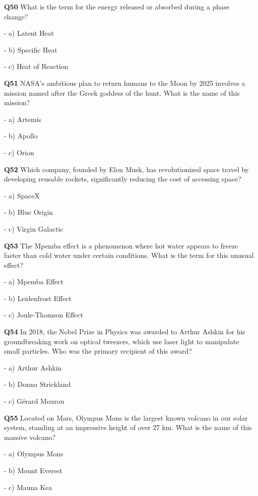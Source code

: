 \textbf{Q50} What is the term for the energy released or absorbed during a phase change?\par
\quad - a) Latent Heat\par
\quad - b) Specific Heat\par
\quad - c) Heat of Reaction\par

\textbf{Q51} NASA's ambitious plan to return humans to the Moon by 2025 involves a mission named after the Greek goddess of the hunt. What is the name of this mission?\par
\quad - a) Artemis\par
\quad - b) Apollo\par
\quad - c) Orion\par

\textbf{Q52} Which company, founded by Elon Musk, has revolutionized space travel by developing reusable rockets, significantly reducing the cost of accessing space?\par
\quad - a) SpaceX\par
\quad - b) Blue Origin\par
\quad - c) Virgin Galactic\par

\textbf{Q53} The Mpemba effect is a phenomenon where hot water appears to freeze faster than cold water under certain conditions. What is the term for this unusual effect?\par
\quad - a) Mpemba Effect\par
\quad - b) Leidenfrost Effect\par
\quad - c) Joule-Thomson Effect\par

\textbf{Q54} In 2018, the Nobel Prize in Physics was awarded to Arthur Ashkin for his groundbreaking work on optical tweezers, which use laser light to manipulate small particles. Who was the primary recipient of this award?\par
\quad - a) Arthur Ashkin\par
\quad - b) Donna Strickland\par
\quad - c) Gérard Mourou\par

\textbf{Q55} Located on Mars, Olympus Mons is the largest known volcano in our solar system, standing at an impressive height of over 27 km. What is the name of this massive volcano?\par
\quad - a) Olympus Mons\par
\quad - b) Mount Everest\par
\quad - c) Mauna Kea\par

